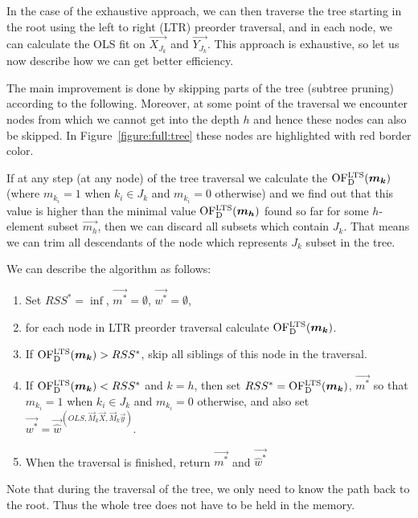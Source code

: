 In the case of the exhaustive approach, we can then traverse the tree starting in the root using the left to right (LTR) preorder traversal, and in each node, we can calculate the OLS fit on $\vec{ X_{J_k} }$ and $\vec{ Y_{J_k} }$. This approach is exhaustive, so let us now describe how we can get better efficiency. 

The main improvement is done by skipping parts of the tree (subtree pruning) according to the following. Moreover, at some point of the traversal we encounter nodes from which we cannot get into the depth $h$ and hence these nodes can also be skipped. In Figure~\ref{figure:full:tree} these nodes are highlighted with red border color. 

If at any step (at any node) of the tree traversal we calculate the
$\operatorname{OF^{LTS}_D}(\boldsymbol{m_k})$ (where $m_{k_i} = 1$ when $k_i \in J_k$ and $m_{k_i} = 0$ otherwise) and we find out that this value is higher than the minimal value $\operatorname{OF^{LTS}_D}(\boldsymbol{m_h})$ found so far for some $h$-element subset $\vec{m_h}$, then we can discard all subsets which contain $J_k$. That means we can trim all descendants of the node which represents $J_k$ subset in the tree.

We can describe the algorithm as follows:

\begin{enumerate}
    \item Set $RSS^* = \inf$, $\vec{m^*} = \emptyset$, $\vec{{w}^*} = \emptyset$,
    \item for each node in LTR preorder traversal calculate $\operatorname{OF^{LTS}_D}(\boldsymbol{m_k})$.
    \item If $\operatorname{OF^{LTS}_D}(\boldsymbol{m_k}) > RSS^*$, skip all siblings of this node in the traversal.
    \item If $\operatorname{OF^{LTS}_D}(\boldsymbol{m_k}) < RSS^* $ and $k = h$, then set $RSS^* = \operatorname{OF^{LTS}_D}(\boldsymbol{m_k})$, $\vec{m^*}$ so that $m_{k_i} = 1$ when $k_i \in J_k$ and $m_{k_i} = 0$ otherwise, and also set $\vec{{w}^*} = \vec{\hat{w}}^{(OLS,\vec{M}_{k}\vec{X}, \vec{M}_{k}\vec{y})}$.
 \item When the traversal is finished, return $\vec{m^*}$ and $\vec{\hat{w}^*}$
\end{enumerate}

Note that during the traversal of the tree, we only need to know the path back to the root. Thus the whole tree does not have to be held in the memory. 

